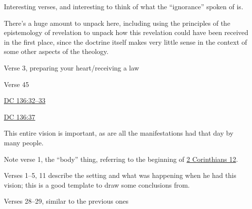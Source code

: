 \begin{compactdesc}
\begin{compactitem}
				\end{compactitem}
			\item[{\hyperref[DC131]{DC 131:5--6}}] Interesting verses, and interesting to think of what the ``ignorance'' spoken of is.
			\item[{\hyperref[DC132]{DC 132}}]
				\begin{compactitem}
					\item There's a huge amount to unpack here, including using the principles of the epistemology of revelation to unpack how this revelation could have been received in the first place, since the doctrine itself makes very little sense in the context of some other aspects of the theology.
					\item Verse 3, preparing your heart/receiving a law
					\item Verse 45
				\end{compactitem}
			\item[{\hyperref[DC136]{DC 136}}]
				\begin{compactitem}
					\item \hyperref[DC136-32]{DC 136:32--33}
					\item \hyperref[DC136-37]{DC 136:37}
				\end{compactitem}
			\item[{\hyperref[DC137]{DC 137}}]
				\begin{compactitem}
					\item This entire vision is important, as are all the manifestations had that day by many people.
					\item Note verse 1, the ``body'' thing, referring to the beginning of \hyperref[2CORINTHIANS-12]{2 Corinthians 12}.
				\end{compactitem}
			\item[{\hyperref[DC138]{DC 138}}]
				\begin{compactitem}
					\item Verses 1--5, 11 describe the setting and what was happening when he had this vision; this is a good template to draw some conclusions from.
					\item Verses 28--29, similar to the previous ones
				\end{compactitem}
		\end{compactdesc}
		
	
